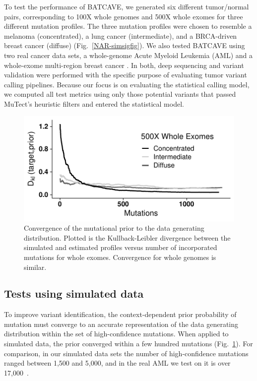 \documentclass[a4,center,fleqn]{NAR}
\newcommand{\batcave}{BATCAVE\xspace}
\begin{document}
To test the performance of \batcave, we generated six different tumor/normal pairs, corresponding to 100X whole genomes and 500X whole exomes for three different mutation profiles.
The three mutation profiles were chosen to resemble a melanoma (concentrated), a lung cancer (intermediate), and a BRCA-driven breast cancer (diffuse) (Fig.~\ref{NAR-simsigfig}).
We also tested \batcave using two real cancer data sets, a whole-genome Acute Myeloid Leukemia (AML) \cite{Griffith2015} and a whole-exome multi-region breast cancer \cite{Shi2018}.
In both, deep sequencing and variant validation were performed with the specific purpose of evaluating tumor variant calling pipelines.
Because our focus is on evaluating the statistical calling model, we computed all test metrics using only those potential variants that passed MuTect's heuristic filters and entered the statistical model.

\begin{figure}
\centering
  \includegraphics{figures/kl_only.pdf}
  \caption{Convergence of the mutational prior to the data generating distribution. Plotted is the Kullback-Leibler divergence between the simulated and estimated profiles versus number of incorporated mutations for whole exomes. Convergence for whole genomes is similar.
  }
\label{NAR-kl_fig}
\end{figure}

\subsection{Tests using simulated data}

To improve variant identification, the context-dependent prior probability of mutation must converge to an accurate representation of the data generating distribution within the set of high-confidence mutations.
When applied to simulated data, the prior converged within a few hundred mutations (Fig.~\ref{NAR-kl_fig}).
For comparison, in our simulated data sets the number of high-confidence mutations ranged between 1,500 and 5,000, and in the real AML we test on it is over 17,000~\cite{Griffith2015}.
\end{document}
